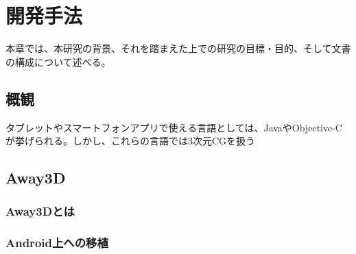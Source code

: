 \chapter{開発手法}
\label{chap:coding}

本章では、本研究の背景、それを踏まえた上での研究の目標・目的、そして文書の構成について述べる。

\section{概観}
タブレットやスマートフォンアプリで使える言語としては、JavaやObjective-Cが挙げられる。しかし、これらの言語では3次元CGを扱う

\section{Away3D}

\subsection{Away3Dとは}

\subsection{Android上への移植}


